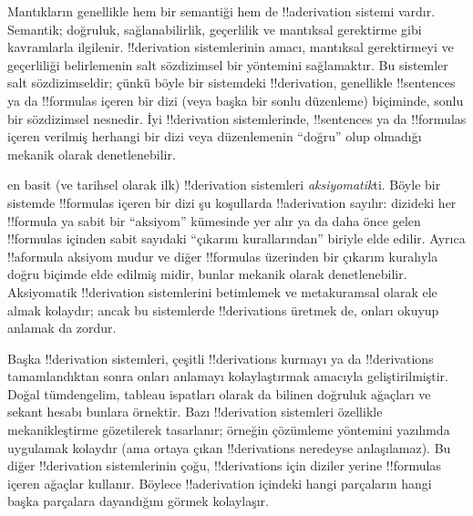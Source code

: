 

      {}
      {}


Mantıkların genellikle hem bir semantiği hem de !!a{derivation} sistemi
vardır. Semantik; doğruluk, sağlanabilirlik, geçerlilik ve mantıksal gerektirme
gibi kavramlarla ilgilenir. !!{derivation} sistemlerinin amacı, mantıksal
gerektirmeyi ve geçerliliği belirlemenin salt sözdizimsel bir yöntemini
sağlamaktır. Bu sistemler salt sözdizimseldir; çünkü böyle bir sistemdeki
!!{derivation}, genellikle !!{sentence}s ya da !!{formula}s içeren bir dizi
(veya başka bir sonlu düzenleme) biçiminde, sonlu bir sözdizimsel nesnedir.
İyi !!{derivation} sistemlerinde, !!{sentence}s ya da !!{formula}s içeren
verilmiş herhangi bir dizi veya düzenlemenin “doğru” olup olmadığı mekanik
olarak denetlenebilir.

 en basit
(ve tarihsel olarak ilk) !!{derivation}
sistemleri \emph{aksiyomatik}ti. Böyle bir sistemde !!{formula}s içeren bir
dizi şu koşullarda !!a{derivation} sayılır: dizideki her !!{formula} ya sabit
bir “aksiyom” kümesinde yer alır ya da daha önce gelen !!{formula}s içinden
sabit sayıdaki “çıkarım kurallarından” biriyle elde edilir. Ayrıca !!a{formula} aksiyom
mudur ve diğer !!{formula}s üzerinden bir çıkarım kuralıyla doğru biçimde
elde edilmiş midir, bunlar mekanik olarak denetlenebilir. Aksiyomatik
!!{derivation} sistemlerini betimlemek ve metakuramsal olarak ele almak
kolaydır; ancak bu sistemlerde !!{derivation}s üretmek de, onları okuyup
anlamak da zordur.

Başka !!{derivation} sistemleri, çeşitli !!{derivation}s kurmayı ya da
!!{derivation}s tamamlandıktan sonra onları anlamayı kolaylaştırmak amacıyla
geliştirilmiştir. Doğal tümdengelim, tableau ispatları olarak da bilinen
doğruluk ağaçları ve sekant hesabı bunlara örnektir. Bazı !!{derivation}
sistemleri özellikle mekanikleştirme gözetilerek tasarlanır; örneğin
çözümleme yöntemini yazılımda uygulamak kolaydır (ama ortaya çıkan
!!{derivation}s neredeyse anlaşılamaz). Bu diğer !!{derivation}
sistemlerinin çoğu, !!{derivation}s için diziler yerine !!{formula}s içeren
ağaçlar kullanır. Böylece !!a{derivation} içindeki hangi parçaların hangi
başka parçalara dayandığını görmek kolaylaşır.

